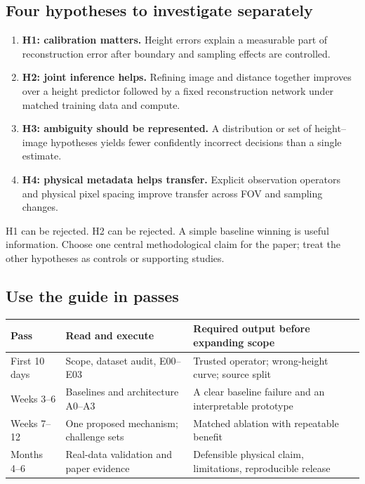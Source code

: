 \subsection{Four hypotheses to investigate separately}
\begin{enumerate}
\item \textbf{H1: calibration matters.} Height errors explain a measurable part of reconstruction error after boundary and sampling effects are controlled.
\item \textbf{H2: joint inference helps.} Refining image and distance together improves over a height predictor followed by a fixed reconstruction network under matched training data and compute.
\item \textbf{H3: ambiguity should be represented.} A distribution or set of height--image hypotheses yields fewer confidently incorrect decisions than a single estimate.
\item \textbf{H4: physical metadata helps transfer.} Explicit observation operators and physical pixel spacing improve transfer across FOV and sampling changes.
\end{enumerate}
H1 can be rejected. H2 can be rejected. A simple baseline winning is useful information. Choose one central methodological claim for the paper; treat the other hypotheses as controls or supporting studies.

\subsection{Use the guide in passes}
\begin{tabularx}{\linewidth}{P{22mm}YY}
\toprule Pass & Read and execute & Required output before expanding scope\\\midrule
First 10 days & Scope, dataset audit, E00--E03 & Trusted operator; wrong-height curve; source split\\
Weeks 3--6 & Baselines and architecture A0--A3 & A clear baseline failure and an interpretable prototype\\
Weeks 7--12 & One proposed mechanism; challenge sets & Matched ablation with repeatable benefit\\
Months 4--6 & Real-data validation and paper evidence & Defensible physical claim, limitations, reproducible release\\\bottomrule
\end{tabularx}



